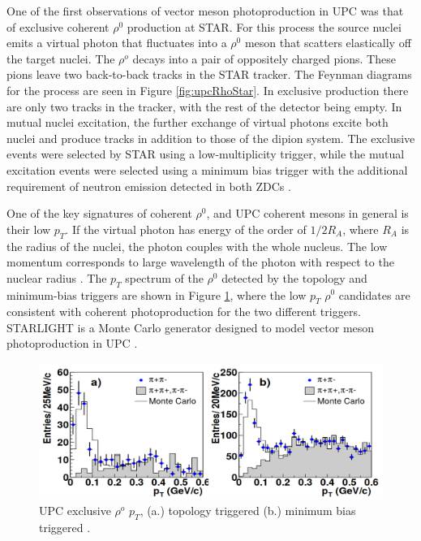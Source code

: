 One of the first observations of vector meson photoproduction in UPC was that of exclusive coherent $\rho^0$ production at STAR. For this process the source nuclei emits a virtual photon that fluctuates into a $\rho^0$ meson that scatters elastically off the target nuclei. The $\rho^o$ decays into a pair of oppositely charged pions. These pions leave two back-to-back tracks in the STAR tracker. The Feynman diagrams for the process are seen in Figure \ref{fig:upcRhoStar}. In exclusive production there are only two tracks in the tracker, with the rest of the detector being empty. In mutual nuclei excitation, the further exchange of virtual photons excite both nuclei and produce tracks in addition to those of the dipion system. The exclusive events were selected by STAR using a low-multiplicity trigger, while the mutual excitation events were selected using a minimum bias trigger with the additional requirement of neutron emission detected in both ZDCs \cite{Adler:2002sc}. 

One of the key signatures of coherent $\rho^0$, and UPC coherent mesons in general is their low $p_T$. If the virtual photon has energy of the order of $1/2R_{A}$, where $R_{A}$ is the radius of the nuclei, the photon couples with the whole nucleus. The low momentum corresponds to large wavelength of the photon with respect to the nuclear radius \cite{Guzey:2013taa,Frankfurt:2006wg,Baltz:2002pp,Klein:2003vd}. The $p_T$ spectrum of the $\rho^0$ detected by the topology and minimum-bias triggers are shown in Figure \ref{fig:upcRhoStarPt}, where the low $p_T$ $\rho^0$ candidates are consistent with coherent photoproduction for the two different triggers. STARLIGHT is a Monte Carlo generator designed to model vector meson photoproduction in UPC \cite{starlight}.

\begin{figure}[h!]
\begin{centering}
\includegraphics[width=5.5in]{Chapter2/importfigs/rho_upc_pt_star.png}
\par\end{centering}
\caption{UPC exclusive $\rho^o$ $p_T$, (a.) topology triggered (b.) minimum bias triggered \cite{Adler:2002sc}. \label{fig:upcRhoStarPt}}
\end{figure}

